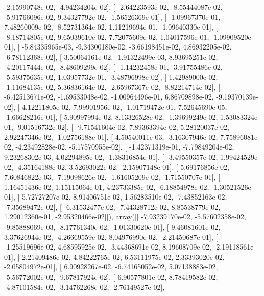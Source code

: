 \documentclass{article}
\begin{document}
         -2.15990748e-02,  -4.94234204e-02],
       [ -2.64223593e-02,  -8.55444087e-02,  -5.91766096e-02,
          9.34327792e-02,  -1.56526369e-01],
       [ -1.09967370e-01,   7.48260009e-02,  -8.52731364e-02,
          1.11219694e-01,  -1.09640330e-01],
       [ -8.18714805e-02,   9.65039610e-02,   7.72075609e-02,
          1.04017596e-01,  -1.09909520e-01],
       [ -5.84335965e-03,  -9.34300180e-02,  -3.66198451e-02,
          4.86932205e-02,  -6.78112368e-02],
       [  3.50064161e-02,  -1.91322499e-03,   8.93695251e-02,
         -4.20117444e-02,  -8.48609299e-02],
       [ -1.14232458e-01,  -3.91755486e-02,  -5.59375635e-02,
          1.03957732e-01,  -3.48796998e-02],
       [  1.42989000e-02,  -1.11684135e-02,   5.36836164e-02,
         -2.65967367e-02,  -8.82214714e-02],
       [ -6.42513671e-02,  -1.69533048e-02,  -1.00964496e-01,
          6.86709898e-02,  -9.19370139e-02],
       [  4.12211805e-02,   7.99901956e-02,  -1.01719472e-01,
          7.52645690e-05,  -1.66628216e-01],
       [  5.90997994e-02,   8.13326528e-02,  -1.39699249e-02,
          1.53083324e-01,  -9.01516732e-02],
       [ -9.71541604e-02,   7.89363394e-02,   5.28120037e-02,
          2.92247346e-02,  -1.02756188e-01],
       [  4.50540011e-03,  -3.16307946e-02,   7.75896081e-02,
         -4.23492828e-02,  -5.17570955e-02],
       [ -1.42371319e-01,  -7.79849204e-02,   9.23268302e-03,
          4.02294895e-02,  -1.38316854e-01],
       [ -3.49550357e-02,   1.99424529e-02,  -4.35164188e-02,
          3.52693022e-02,  -2.15907148e-01],
       [  5.69176856e-02,   7.60846822e-03,  -7.19098626e-02,
         -1.61605209e-02,  -1.71550707e-01],
       [  1.16451436e-02,   1.15115064e-01,   4.23733385e-02,
         -6.18854978e-02,  -1.30521526e-01],
       [  5.72727207e-02,   8.91406751e-02,   1.56283510e-02,
         -7.43852163e-02,  -7.35689472e-02],
       [ -6.31532477e-02,  -7.44328712e-02,   8.85538779e-02,
          1.29012360e-01,  -2.95320466e-02]]), array([[ -7.93239170e-02,  -5.57602358e-02,  -9.85888069e-03,
         -8.17761340e-02,  -1.01330620e-01],
       [  9.46081601e-02,   3.37626944e-02,  -4.26669559e-02,
          8.04976990e-02,  -2.21450687e-01],
       [ -1.25519696e-02,   4.68595925e-02,  -3.44368691e-02,
          8.19608709e-02,  -2.19118561e-01],
       [  2.21409486e-02,   4.84222765e-02,   6.53111975e-02,
          2.33393020e-02,  -2.05804972e-01],
       [  6.90928267e-02,  -6.74165052e-02,   5.07138883e-02,
         -5.56772002e-02,  -9.67817924e-02],
       [  6.90577801e-02,   8.78419582e-02,  -4.87101584e-02,
         -3.14762268e-02,  -2.76149527e-02],
\end{document}
